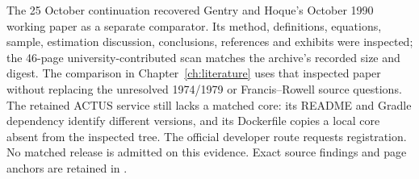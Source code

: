 The 25 October continuation recovered Gentry and Hoque's October 1990
working paper as a separate comparator. Its method, definitions, equations,
sample, estimation discussion, conclusions, references and exhibits were
inspected; the 46-page university-contributed scan matches the archive's
recorded size and digest. The comparison in Chapter~\ref{ch:literature}
uses that inspected paper without replacing the unresolved 1974/1979 or
Francis--Rowell source questions. The retained ACTUS service still lacks a
matched core: its README and Gradle dependency identify different versions,
and its Dockerfile copies a local core absent from the inspected tree.
The official developer route requests registration. No matched release is
admitted on this evidence. Exact source findings and page anchors are retained
in .

